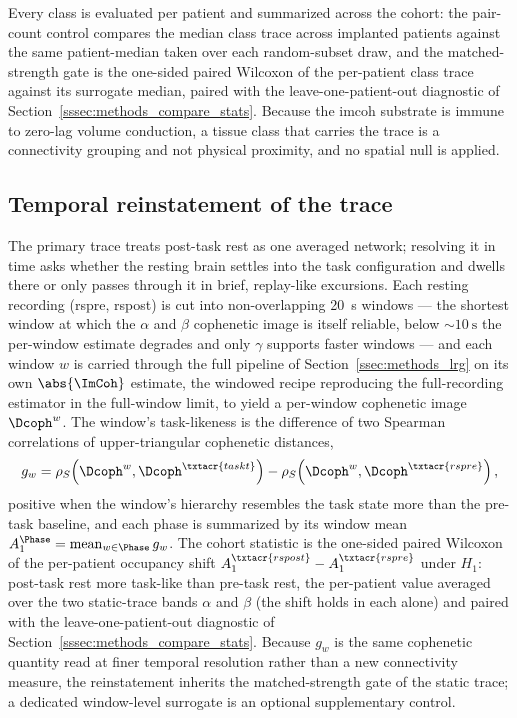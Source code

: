 Every class is evaluated per patient and summarized across the cohort: the pair-count control compares the median class trace across implanted patients against the same patient-median taken over each random-subset draw, and the matched-strength gate is the one-sided paired Wilcoxon of the per-patient class trace against its surrogate median, paired with the leave-one-patient-out diagnostic of Section~\ref{sssec:methods_compare_stats}. Because the \gls{imcoh} substrate is immune to zero-lag volume conduction, a tissue class that carries the trace is a connectivity grouping and not physical proximity, and no spatial null is applied.



\subsection{Temporal reinstatement of the trace}
\label{ssec:methods_reinstatement}

The primary trace treats post-task rest as one averaged network; resolving it in time asks whether the resting brain settles into the task configuration and dwells there or only passes through it in brief, replay-like excursions. Each resting recording (\acrshort{rspre}, \acrshort{rspost}) is cut into non-overlapping \qty{20}{\second} windows --- the shortest window at which the \(\alpha\) and \(\beta\) cophenetic image is itself reliable, below \(\sim\qty{10}{\second}\) the per-window estimate degrades and only \(\gamma\) supports faster windows --- and each window \(w\) is carried through the full pipeline of Section~\ref{ssec:methods_lrg} on its own \(\abs{\ImCoh}\) estimate, the windowed recipe reproducing the full-recording estimator in the full-window limit, to yield a per-window cophenetic image \(\Dcoph^{w}\). The window's task-likeness is the difference of two Spearman correlations of upper-triangular cophenetic distances,
\begin{equation}
    g_{w} = \rho_{S}\!\left(\Dcoph^{w}, \Dcoph^{\txtacr{taskt}}\right) - \rho_{S}\!\left(\Dcoph^{w}, \Dcoph^{\txtacr{rspre}}\right),
    \label{eq:methods_reinstatement_g}
\end{equation}
positive when the window's hierarchy resembles the task state more than the pre-task baseline, and each phase is summarized by its window mean \(A_{1}^{\Phase} = \operatorname{mean}_{w \in \Phase} g_{w}\). The cohort statistic is the one-sided paired Wilcoxon of the per-patient occupancy shift \(A_{1}^{\txtacr{rspost}} - A_{1}^{\txtacr{rspre}}\) under \(H_{1}\): post-task rest more task-like than pre-task rest, the per-patient value averaged over the two static-trace bands \(\alpha\) and \(\beta\) (the shift holds in each alone) and paired with the leave-one-patient-out diagnostic of Section~\ref{sssec:methods_compare_stats}. Because \(g_{w}\) is the same cophenetic quantity read at finer temporal resolution rather than a new connectivity measure, the reinstatement inherits the matched-strength gate of the static trace; a dedicated window-level surrogate is an optional supplementary control.

